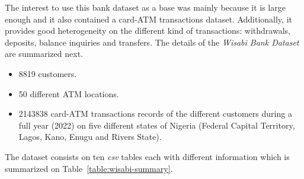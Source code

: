 The interest to use this bank dataset as a base was mainly because it is large enough and it also contained a card-ATM transactions dataset. Additionally, it provides good heterogeneity on the different kind of transactions: withdrawals, deposits, balance inquiries and transfers. 
The details of the \emph{Wisabi Bank Dataset} are summarized next.
 
\begin{itemize}
    \item 8819 customers.
    \item 50 different ATM locations.
    \item 2143838 card-ATM transactions records of the different customers during a full year (2022) on five different states of Nigeria (Federal Capital Territory, Lagos, Kano, Enugu and Rivers State).
\end{itemize}

The dataset consists on ten \emph{csv} tables each with different information which is summarized on Table~\ref{table:wisabi-summary}.

